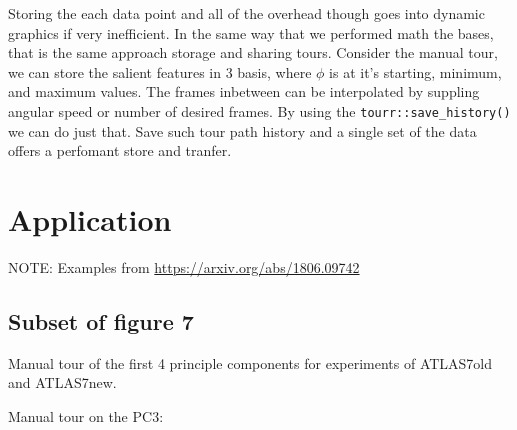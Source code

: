 \documentclass{monashthesis}
\begin{document}
Storing the each data point and all of the overhead though goes into dynamic graphics if very inefficient. In the same way that we performed math the bases, that is the same approach storage and sharing tours. Consider the manual tour, we can store the salient features in 3 basis, where \(\phi\) is at it's starting, minimum, and maximum values. The frames inbetween can be interpolated by suppling angular speed or number of desired frames. By using the \texttt{tourr::save\_history()} we can do just that. Save such tour path history and a single set of the data offers a perfomant store and tranfer.

\hypertarget{application}{%
\section{Application}\label{application}}

NOTE: Examples from \url{https://arxiv.org/abs/1806.09742}
\textcite{cook_dynamical_2018}

\hypertarget{subset-of-figure-7}{%
\subsection{Subset of figure 7}\label{subset-of-figure-7}}

Manual tour of the first 4 principle components for experiments of ATLAS7old and ATLAS7new.

Manual tour on the PC3:
\end{document}
